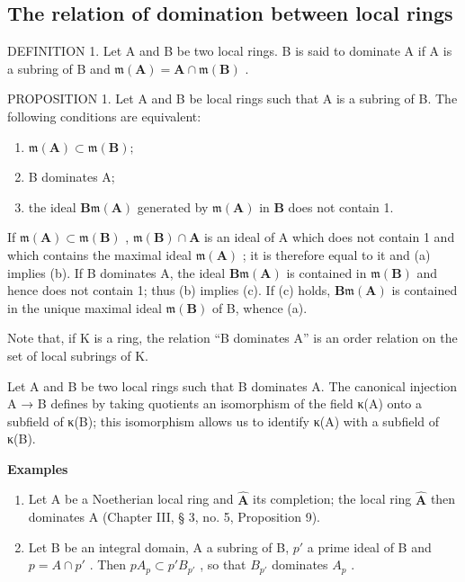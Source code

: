 \subsection{The relation of domination between local rings}

DEFINITION 1. Let A and B be two local rings. B is said to dominate A if A is a subring of B and \(\mathfrak{m}(\mathbf{A}) = \mathbf{A} \cap \mathfrak{m}(\mathbf{B})\) .

PROPOSITION 1. Let A and B be local rings such that A is a subring of B. The following conditions are equivalent:

\begin{enumerate}
\def\labelenumi{(\alph{enumi})}
\item
  \(\mathfrak{m}(\mathbf{A}) \subset \mathfrak{m}(\mathbf{B});\)
\item
  B dominates A;
\item
  the ideal \(\mathbf{B}\mathfrak{m}(\mathbf{A})\) generated by \(\mathfrak{m}(\mathbf{A})\) in \(\mathbf{B}\) does not contain 1.
\end{enumerate}

If \(\mathfrak{m}(\mathbf{A}) \subset \mathfrak{m}(\mathbf{B})\) , \(\mathfrak{m}(\mathbf{B}) \cap \mathbf{A}\) is an ideal of A which does not contain 1 and which contains the maximal ideal \(\mathfrak{m}(\mathbf{A})\) ; it is therefore equal to it and (a) implies (b). If B dominates A, the ideal \(\mathbf{B}\mathfrak{m}(\mathbf{A})\) is contained in \(\mathfrak{m}(\mathbf{B})\) and hence does not contain 1; thus (b) implies (c). If (c) holds, \(\mathbf{B}\mathfrak{m}(\mathbf{A})\) is contained in the unique maximal ideal \(\mathfrak{m}(\mathbf{B})\) of B, whence (a).

Note that, if K is a ring, the relation ``B dominates A'' is an order relation on the set of local subrings of K.

Let A and B be two local rings such that B dominates A. The canonical injection A → B defines by taking quotients an isomorphism of the field κ(A) onto a subfield of κ(B); this isomorphism allows us to identify κ(A) with a subfield of κ(B).

\textbf{Examples}\par

\begin{enumerate}
\def\labelenumi{(\arabic{enumi})}
\item
  Let A be a Noetherian local ring and \(\hat{\mathbf{A}}\) its completion; the local ring \(\hat{\mathbf{A}}\) then dominates A (Chapter III, § 3, no. 5, Proposition 9).
\item
  Let B be an integral domain, A a subring of B, \(p'\) a prime ideal of B and \(p = A \cap p'\) . Then \(pA_{p} \subset p'B_{p'}\) , so that \(B_{p'}\) dominates \(A_{p}\) .
\end{enumerate}

